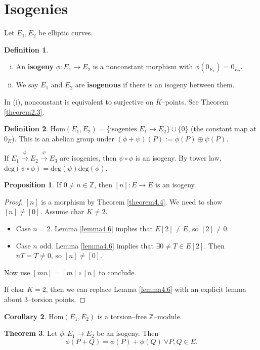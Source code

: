 \documentclass{article}
\theoremstyle{definition}
\newtheorem{theorem}{Theorem}[section]
\newtheorem{cor}[theorem]{Corollary}
\newtheorem{prop}[theorem]{Proposition}
\newtheorem{defn}{Definition}[section]
\begin{document}
\section{Isogenies}
Let $E_1,E_2$ be elliptic curves.
\begin{defn}
    \begin{enumerate}[(i)]
        \item An \textbf{isogeny} $\phi : E_1 \to E_2$ is a nonconstant morphism with $\phi(0_{E_1}) = 0_{E_2}$.
        \item We say $E_1$ and $E_2$ are \textbf{isogenous} if there is an isogeny between them.
    \end{enumerate}
\end{defn}
In (i), nonconstant is equivalent to surjective on $\overline{K}$--points. See Theorem \ref{theorem2.3}.
\begin{defn}
    $\text{Hom}(E_1,E_2) = \{\text{isogenies }E_1 \to E_2\} \cup \{0\}$ (the constant map at $0_E$). This is an abelian group under $(\phi + \psi)(P) := \phi(P) \oplus \psi(P)$.
\end{defn}
If $E_1 \stackrel{\phi}{\to} E_2 \stackrel{\psi}{\to} E_3$ are isogenies, then $\psi \circ \phi$ is an isogeny. By tower law, $\text{deg}(\psi \circ \phi) = \text{deg}(\psi)\text{deg}(\phi)$.
\begin{prop}
    If $0 \neq n \in \mathbb{Z}$, then $[n] : E \to E$ is an isogeny.
\end{prop}
\begin{proof}
    $[n]$ is a morphism by Theorem \ref{theorem4.4}. We need to show $[n] \neq [0]$. Assume $\text{char }K \neq 2$.
    \begin{itemize}
        \item Case $n=2$. Lemma \ref{lemma4.6} implies that $E[2] \neq E$, so $[2] \neq 0$.
        \item Case $n$ odd. Lemma \ref{lemma4.6} implies that $\exists 0 \neq T \in E[2]$. Then $nT = T \neq 0$, so $[n] \neq [0]$.
    \end{itemize}
    Now use $[mn] = [m]\circ[n]$ to conclude.
    \vspace{1mm}
     
    If $\text{char }K=2$, then we can replace Lemma \ref{lemma4.6} with an explicit lemma about 3--torsion points.
\end{proof}
\begin{cor}
    $\text{Hom}(E_1,E_2)$ is a torsion--free $\mathbb{Z}$--module.
\end{cor}
\begin{theorem}\label{theorem5.3}
    Let $\phi : E_1 \to E_2$ be an isogeny. Then \[
    \phi(P+Q) = \phi(P)+\phi(Q) ~\forall P,Q \in E.
    \]
\end{theorem}
\end{document}
